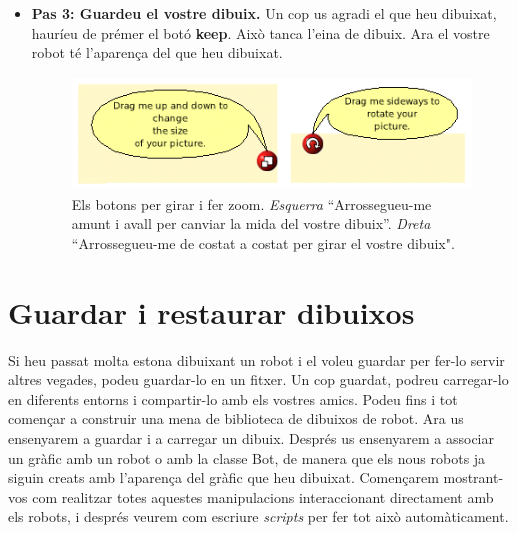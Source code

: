\begin{itemize}
 \item[] \textbf{Pas 3: Guardeu el vostre dibuix.} Un cop us agradi el que heu dibuixat, hauríeu de prémer el botó \textbf{keep}. Això tanca l'eina de dibuix. Ara el vostre robot té l'aparença del que heu dibuixat.
\begin{figure}[h!]
\begin{center}
\includegraphics[height=30mm ,width=108mm ]{Imatges/figura6-7.png} 
\end{center}
\caption{Els botons per girar i fer zoom. \emph{Esquerra} ``Arrossegueu-me amunt i avall per canviar la mida del vostre dibuix''. \emph{Dreta} ``Arrossegueu-me de costat a costat per girar el vostre dibuix".}
\label{fig0607}
\end{figure}
\end{itemize}

\section{Guardar i restaurar dibuixos}
Si heu passat molta estona dibuixant un robot i el voleu guardar per fer-lo servir altres vegades, podeu guardar-lo en un fitxer. Un cop guardat, podreu carregar-lo en diferents entorns i compartir-lo amb els vostres amics. Podeu fins i tot començar a construir una mena de biblioteca de dibuixos de robot. Ara us ensenyarem a guardar i a carregar un dibuix. Després us ensenyarem a associar un gràfic amb un robot o amb la classe \textsf{Bot}, de manera que els nous robots ja siguin creats amb l'aparença del gràfic que heu dibuixat. Començarem mostrant-vos com realitzar totes aquestes manipulacions interaccionant directament amb els robots, i després veurem com escriure \emph{scripts} per fer tot això automàticament.


